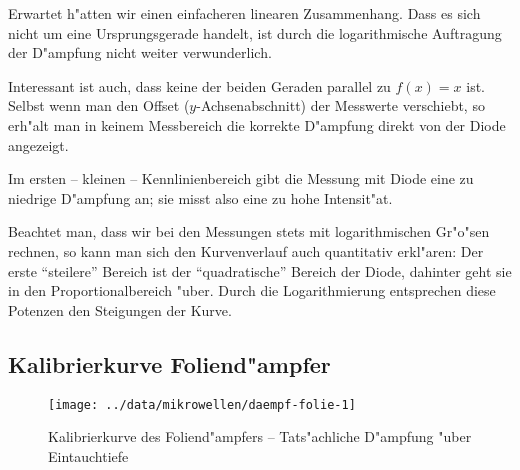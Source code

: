 \documentclass[a4paper,12pt]{article}
\begin{document}
Erwartet h"atten wir einen einfacheren linearen Zusammenhang.  Dass es
sich nicht um eine Ursprungsgerade handelt, ist 
durch die logarithmische Auftragung der D"ampfung 
nicht weiter
verwunderlich.



Interessant ist auch, dass keine der beiden Geraden parallel zu
$f(x)=x$ ist. Selbst wenn man den Offset ($y$-Achsenabschnitt) der
Messwerte verschiebt, so erh"alt man in keinem Messbereich die
korrekte D"ampfung direkt von der Diode angezeigt.



Im ersten -- kleinen -- Kennlinienbereich gibt die Messung mit Diode eine zu
niedrige D"ampfung an; sie misst also eine zu hohe
Intensit"at. 

Beachtet man, dass wir bei den Messungen stets mit logarithmischen
Gr"o"sen rechnen, so kann man sich den Kurvenverlauf auch quantitativ
erkl"aren: Der erste "`steilere"' Bereich ist der "`quadratische"'
Bereich der Diode, dahinter geht sie in den Proportionalbereich
"uber. Durch die Logarithmierung entsprechen diese Potenzen den
Steigungen der Kurve.





\subsection{Kalibrierkurve Foliend"ampfer}
\label{sec:kalibrierkurve_foliendampfer}

\begin{figure}[!h]
  \centering
 \texttt{[image: ../data/mikrowellen/daempf-folie-1]} 
  \caption{Kalibrierkurve des Foliend"ampfers -- Tats"achliche
    D"ampfung "uber Eintauchtiefe}
  \label{fig:kalibrierkurve_folie}
\end{figure}
\end{document}

